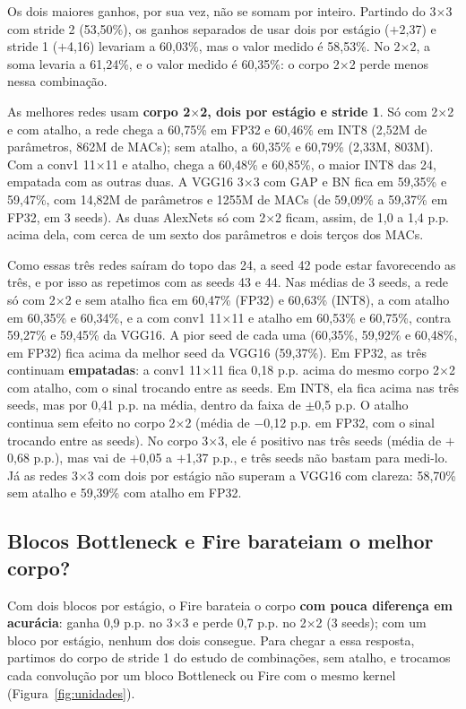 \documentclass[conference]{IEEEtran}
\newcommand{\by}{\ensuremath{\times}}
\begin{document}
Os dois maiores ganhos, por sua vez, não se somam por inteiro. Partindo do 3\by3 com stride 2 (53,50\%), os ganhos separados de usar dois por estágio ($+$2,37) e stride 1 ($+$4,16) levariam a 60,03\%, mas o valor medido é 58,53\%. No 2\by2, a soma levaria a 61,24\%, e o valor medido é 60,35\%: o corpo 2\by2 perde menos nessa combinação.

As melhores redes usam \textbf{corpo 2\by2, dois por estágio e stride 1}. Só com 2\by2 e com atalho, a rede chega a 60,75\% em FP32 e 60,46\% em INT8 (2,52M de parâmetros, 862M de MACs); sem atalho, a 60,35\% e 60,79\% (2,33M, 803M). Com a conv1 11\by11 e atalho, chega a 60,48\% e 60,85\%, o maior INT8 das 24, empatada com as outras duas. A VGG16 3\by3 com GAP e BN fica em 59,35\% e 59,47\%, com 14,82M de parâmetros e 1255M de MACs (de 59,09\% a 59,37\% em FP32, em 3 seeds). As duas AlexNets só com 2\by2 ficam, assim,
de 1,0 a 1,4 p.p. acima dela, com cerca de um sexto dos parâmetros e dois terços dos MACs.

Como essas três redes saíram do topo das 24, a seed 42 pode estar favorecendo as três, e por isso as repetimos com as seeds 43 e 44. Nas médias de 3 seeds, a rede só com 2\by2 e sem atalho fica em 60,47\% (FP32) e 60,63\% (INT8), a com atalho em 60,35\% e 60,34\%, e a com conv1 11\by11 e atalho em 60,53\% e 60,75\%, contra 59,27\% e 59,45\% da VGG16. A pior seed de cada uma (60,35\%, 59,92\% e 60,48\%, em FP32) fica acima da melhor seed da VGG16 (59,37\%). Em FP32, as três continuam \textbf{empatadas}: a conv1 11\by11 fica 0,18 p.p. acima do mesmo corpo 2\by2 com atalho, com o sinal trocando entre as seeds. Em INT8, ela fica acima nas três seeds, mas por 0,41 p.p. na média, dentro da faixa de $\pm$0,5 p.p. O atalho continua sem efeito no corpo 2\by2 (média de $-$0,12 p.p. em FP32, com o sinal trocando entre as seeds). No corpo 3\by3, ele é positivo nas três seeds (média de $+$0,68 p.p.), mas vai de $+$0,05 a $+$1,37 p.p., e três seeds não bastam para medi-lo. Já as redes 3\by3 com dois por estágio não superam a VGG16 com clareza: 58,70\% sem atalho e 59,39\% com atalho em FP32.

\subsection{Blocos Bottleneck e Fire barateiam o melhor corpo?}
\label{sec:unidades}

Com dois blocos por estágio, o Fire barateia o corpo \textbf{com pouca diferença em acurácia}: ganha 0,9 p.p. no 3\by3 e perde 0,7 p.p. no 2\by2 (3 seeds); com um bloco por estágio, nenhum dos dois consegue. Para chegar a essa resposta, partimos do corpo de stride 1 do estudo de combinações, sem atalho, e trocamos cada convolução por um bloco Bottleneck ou Fire com o mesmo kernel (Figura~\ref{fig:unidades}).
\end{document}
